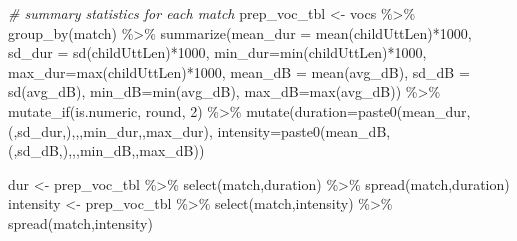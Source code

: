 \documentclass[
]{article}
\newenvironment{Shaded}{\begin{snugshade}}{\end{snugshade}}
\newcommand{\AttributeTok}[1]{\textcolor[rgb]{0.77,0.63,0.00}{#1}}
\newcommand{\CommentTok}[1]{\textcolor[rgb]{0.56,0.35,0.01}{\textit{#1}}}
\newcommand{\DecValTok}[1]{\textcolor[rgb]{0.00,0.00,0.81}{#1}}
\newcommand{\FunctionTok}[1]{\textcolor[rgb]{0.00,0.00,0.00}{#1}}
\newcommand{\NormalTok}[1]{#1}
\newcommand{\OtherTok}[1]{\textcolor[rgb]{0.56,0.35,0.01}{#1}}
\newcommand{\SpecialCharTok}[1]{\textcolor[rgb]{0.00,0.00,0.00}{#1}}
\newcommand{\StringTok}[1]{\textcolor[rgb]{0.31,0.60,0.02}{#1}}
\begin{document}
\begin{Shaded}
\begin{Highlighting}[]
\CommentTok{\# summary statistics for each match }
\NormalTok{prep\_voc\_tbl }\OtherTok{\textless{}{-}}\NormalTok{ vocs }\SpecialCharTok{\%\textgreater{}\%}
  \FunctionTok{group\_by}\NormalTok{(match) }\SpecialCharTok{\%\textgreater{}\%} 
  \FunctionTok{summarize}\NormalTok{(}\AttributeTok{mean\_dur =} \FunctionTok{mean}\NormalTok{(childUttLen)}\SpecialCharTok{*}\DecValTok{1000}\NormalTok{,}
            \AttributeTok{sd\_dur =} \FunctionTok{sd}\NormalTok{(childUttLen)}\SpecialCharTok{*}\DecValTok{1000}\NormalTok{,}
            \AttributeTok{min\_dur=}\FunctionTok{min}\NormalTok{(childUttLen)}\SpecialCharTok{*}\DecValTok{1000}\NormalTok{,}
            \AttributeTok{max\_dur=}\FunctionTok{max}\NormalTok{(childUttLen)}\SpecialCharTok{*}\DecValTok{1000}\NormalTok{,}
            \AttributeTok{mean\_dB =} \FunctionTok{mean}\NormalTok{(avg\_dB),}
            \AttributeTok{sd\_dB =} \FunctionTok{sd}\NormalTok{(avg\_dB),}
            \AttributeTok{min\_dB=}\FunctionTok{min}\NormalTok{(avg\_dB),}
            \AttributeTok{max\_dB=}\FunctionTok{max}\NormalTok{(avg\_dB)) }\SpecialCharTok{\%\textgreater{}\%}
  \FunctionTok{mutate\_if}\NormalTok{(is.numeric, round, }\DecValTok{2}\NormalTok{) }\SpecialCharTok{\%\textgreater{}\%}
    \FunctionTok{mutate}\NormalTok{(}\AttributeTok{duration=}\FunctionTok{paste0}\NormalTok{(mean\_dur,}\StringTok{\textquotesingle{}(\textquotesingle{}}\NormalTok{,sd\_dur,}\StringTok{\textquotesingle{})\textquotesingle{}}\NormalTok{,}\StringTok{\textquotesingle{},\textquotesingle{}}\NormalTok{,min\_dur,}\StringTok{\textquotesingle{}{-}\textquotesingle{}}\NormalTok{,max\_dur),}
           \AttributeTok{intensity=}\FunctionTok{paste0}\NormalTok{(mean\_dB,}\StringTok{\textquotesingle{}(\textquotesingle{}}\NormalTok{,sd\_dB,}\StringTok{\textquotesingle{})\textquotesingle{}}\NormalTok{,}\StringTok{\textquotesingle{},\textquotesingle{}}\NormalTok{,min\_dB,}\StringTok{\textquotesingle{}{-}\textquotesingle{}}\NormalTok{,max\_dB)) }

\NormalTok{dur }\OtherTok{\textless{}{-}}\NormalTok{ prep\_voc\_tbl }\SpecialCharTok{\%\textgreater{}\%} \FunctionTok{select}\NormalTok{(match,duration) }\SpecialCharTok{\%\textgreater{}\%} \FunctionTok{spread}\NormalTok{(match,duration)}
\NormalTok{intensity }\OtherTok{\textless{}{-}}\NormalTok{ prep\_voc\_tbl }\SpecialCharTok{\%\textgreater{}\%} \FunctionTok{select}\NormalTok{(match,intensity) }\SpecialCharTok{\%\textgreater{}\%} \FunctionTok{spread}\NormalTok{(match,intensity)}


\end{Highlighting}
\end{Shaded}
\end{document}
